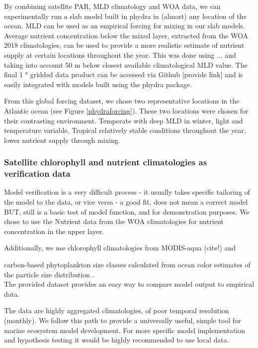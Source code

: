 \documentclass[template.tex]{subfiles}
\begin{document}
By combining satellite PAR, MLD climatology and WOA data, we can experimentally run a slab model built in phydra in (almost) any location of the ocean. MLD can be used as an empirical forcing for mixing in our slab models. Average nutrient concentration below the mixed layer, extracted from the WOA 2018 climatologies, can be used to provide a more realistic estimate of nutrient supply at certain locations throughout the year. This was done using ... and taking into account 50 \unit{m} below closest available climatological MLD value. The final 1 \unit{°} gridded data product can be accessed via Github [provide link] and is easily integrated with models built using the phydra package. 

From this global forcing dataset, we chose two representative locations in the Atlantic ocean (see Figure \ref{phydraforcing}). These two locations were chosen for their contrasting environment. Temperate with deep MLD in winter, light and temperature variable. Tropical relatively stable conditions throughout the year, lower nutrient supply through mixing. \\


\subsubsection{Satellite chlorophyll and nutrient climatologies as verification data}
Model verification is a very difficult process
- it usually takes specific tailoring of the model to the data, or vice versa \citep{Schartau2017}
- a good fit, does not mean a correct model \citep{RykielJr1996}\\

BUT, still is a basic test of model function, and for demonstration purposes.
We chose to use the Nutrient data from the WOA climatologies for nutrient concentration in the upper layer.

Additionally, we use chlorophyll climatologies from MODIS-aqua (cite!) and 

carbon-based phytoplankton size classes calculated from ocean color estimates of the particle size distribution \cite{Kostadinov2016Carbon-basedDistribution}.\\

The provided dataset provides an easy way to compare model output to empirical data. 

The data are highly aggregated climatologies, of poor temporal resolution (monthly). We follow this path to provide a universally useful, simple tool for marine ecosystem model development. For more specific model implementation and hypothesis testing it would be highly recommended to use local data.\\
\end{document}
